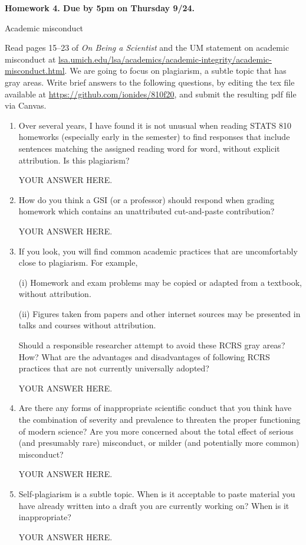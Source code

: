 \documentclass[12pt]{article}
\begin{document}
\begin{center}\bf
Homework 4. Due by 5pm on Thursday 9/24.

Academic misconduct

\end{center}
Read pages 15--23 of {\em On Being a Scientist} and the UM statement on academic misconduct at \url{lsa.umich.edu/lsa/academics/academic-integrity/academic-misconduct.html}. We are going to focus on plagiarism, a subtle topic that has gray areas. Write brief answers to the following questions, by editing the tex file available at \url{https://github.com/ionides/810f20}, and submit the resulting pdf file via Canvas. 

\begin{enumerate}

\item Over several years, I have found it is not unusual when reading STATS 810 homeworks (especially early in the semester) to find responses that include sentences matching the assigned reading word for word, without explicit attribution. Is this plagiarism?

YOUR ANSWER HERE.

\item How do you think a GSI (or a professor) should respond when grading homework which contains an unattributed cut-and-paste contribution?

YOUR ANSWER HERE.

\item If you look, you will find common academic practices that are uncomfortably close to plagiarism. For example,

(i) Homework and exam problems may be copied or adapted from a textbook, without attribution.

(ii) Figures taken from papers and other internet sources may be presented in talks and courses without attribution.

Should a responsible researcher attempt to avoid these RCRS gray areas? How? What are the advantages and disadvantages of following RCRS practices that are not currently universally adopted?

YOUR ANSWER HERE.

\item Are there any forms of inappropriate scientific conduct that you think have the combination of severity and prevalence to threaten the proper functioning of modern science? Are you more concerned about the total effect of serious (and presumably rare) misconduct, or milder (and potentially more common) misconduct?

YOUR ANSWER HERE.

\item Self-plagiarism is a subtle topic. When is it acceptable to paste material you have already written into a draft you are currently working on? When is it inappropriate?

YOUR ANSWER HERE.

\end{enumerate}
\end{document}
